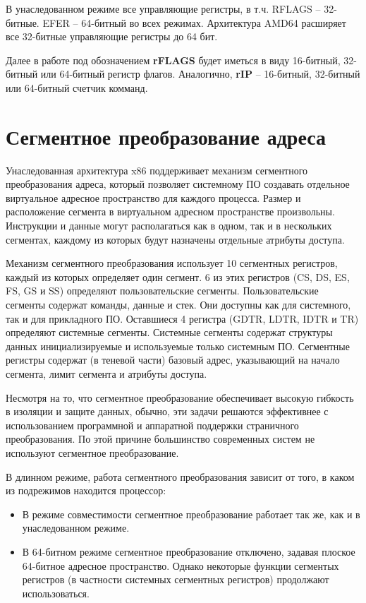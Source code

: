 В унаследованном режиме все управляющие регистры, в т.ч. RFLAGS -- 32-битные. EFER -- 64-битный во всех режимах.
Архитектура AMD64 расширяет все 32-битные управляющие регистры до 64 бит.

Далее в работе под обозначением \textbf{rFLAGS} будет иметься в виду 16-битный, 32-битный или
64-битный регистр флагов. Аналогично, \textbf{rIP} -- 16-битный, 32-битный или 64-битный счетчик комманд.


\section{Сегментное преобразование адреса}
Унаследованная архитектура x86 поддерживает механизм сегментного преобразования адреса, который
позволяет системному ПО создавать отдельное виртуальное адресное пространство для каждого процесса.
Размер и расположение сегмента в виртуальном адресном пространстве произвольны. Инструкции и данные
могут располагаться как в одном, так и в нескольких сегментах, каждому из которых будут назначены
отдельные атрибуты доступа.

Механизм сегментного преобразования использует 10 сегментных регистров, каждый из которых
определяет один сегмент. 6 из этих регистров (CS, DS, ES, FS, GS и SS) определяют пользовательские сегменты.
Пользовательские сегменты содержат команды, данные и стек. Они доступны как для системного, так и для прикладного ПО.
Оставшиеся 4 регистра (GDTR, LDTR, IDTR и TR) определяют системные сегменты. Системные сегменты содержат структуры
данных инициализируемые и используемые только системным ПО. Сегментные регистры содержат (в теневой части)
базовый адрес, указывающий на начало сегмента, лимит сегмента и атрибуты доступа.

Несмотря на то, что сегментное преобразование обеспечивает высокую гибкость в изоляции и защите данных,
обычно, эти задачи решаются эффективнее с использованием программной и аппаратной
поддержки страничного преобразования. По этой причине большинство современных систем не используют
сегментное преобразование.

В длинном режиме, работа сегментного преобразования зависит от того, в каком из подрежимов находится процессор:
\begin{itemize}
\item В режиме совместимости сегментное преобразование работает так же, как и в унаследованном режиме.
\item В 64-битном режиме сегментное преобразование отключено, задавая плоское 64-битное адресное пространство.
	Однако некоторые функции сегментых регистров (в частности системных сегментных регистров) продолжают использоваться.
\end{itemize}

